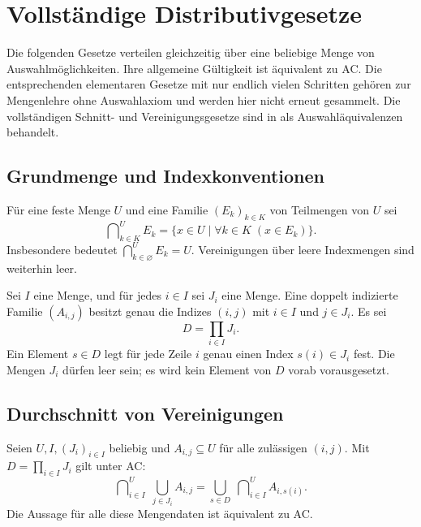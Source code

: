 \chapter{Vollständige Distributivgesetze}
\label{b09guide:ch:distribution}

Die folgenden Gesetze verteilen gleichzeitig über eine beliebige
Menge von Auswahlmöglichkeiten. Ihre allgemeine Gültigkeit ist
äquivalent zu AC. Die entsprechenden elementaren Gesetze mit
nur endlich vielen Schritten gehören zur Mengenlehre ohne
Auswahlaxiom und werden hier nicht erneut gesammelt.
Die vollständigen Schnitt- und Vereinigungsgesetze sind in
\cite{collins} als Auswahläquivalenzen behandelt.

\section{Grundmenge und Indexkonventionen}

\begin{definition}
Für eine feste Menge $U$ und eine Familie $(E_k)_{k\in K}$
von Teilmengen von $U$ sei
\[
 \bigcap\nolimits^U_{k\in K}E_k
   =\{x\in U\mid\forall k\in K\;(x\in E_k)\}.
\]
Insbesondere bedeutet
$\bigcap^U_{k\in\varnothing}E_k=U$.
Vereinigungen über leere Indexmengen sind weiterhin leer.
\end{definition}

\begin{definition}
Sei $I$ eine Menge, und für jedes $i\in I$ sei $J_i$ eine Menge.
Eine doppelt indizierte Familie $(A_{i,j})$ besitzt genau die
Indizes $(i,j)$ mit $i\in I$ und $j\in J_i$.
Es sei
\[
 D=\prod_{i\in I}J_i.
\]
Ein Element $s\in D$ legt für jede Zeile $i$ genau einen Index
$s(i)\in J_i$ fest. Die Mengen $J_i$ dürfen leer sein;
es wird kein Element von $D$ vorab vorausgesetzt.
\end{definition}

\section{Durchschnitt von Vereinigungen}

\begin{theorem}
\label{b09guide:thm:distribution}
Seien $U,I,(J_i)_{i\in I}$ beliebig und
$A_{i,j}\subseteq U$ für alle zulässigen $(i,j)$.
Mit $D=\prod_{i\in I}J_i$ gilt unter AC:
\[
 \boxed{\displaystyle
 \bigcap\nolimits^U_{i\in I}\;
       \bigcup_{j\in J_i}A_{i,j}
 =
 \bigcup_{s\in D}\;
       \bigcap\nolimits^U_{i\in I}A_{i,s(i)}.}
\]
Die Aussage für alle diese Mengendaten ist äquivalent zu AC.
\end{theorem}

